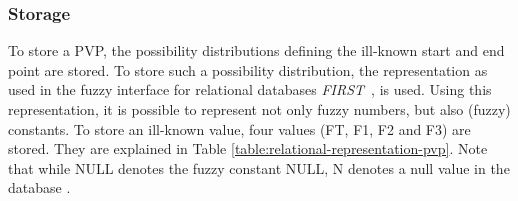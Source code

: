



%  

\subsubsection{Storage}
\label{subsec:storage}
To store a PVP, the possibility distributions defining the ill-known start and end point are stored. To store such a possibility distribution, the representation as used in the fuzzy interface for relational databases \emph{FIRST}~\cite{Medina94gefred.a}, \cite{Gal98} is used. Using this representation, it is possible to represent not only fuzzy numbers, but also (fuzzy) constants. To store an ill-known value, four values (FT, F1, F2 and F3) are stored. They are explained in Table \ref{table:relational-representation-pvp}. Note that while NULL denotes the fuzzy constant NULL, N denotes a null value in the database \cite{Medina94gefred.a}.

%

